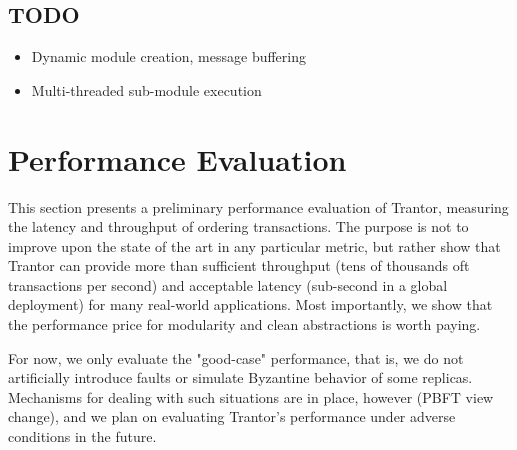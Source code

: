 \documentclass{article}
\begin{document}
\subsubsection{}
\subsubsection{}
\subsubsection{}
\subsubsection{}
\subsubsection{}

\subsection{TODO}

\begin{itemize}
    \item Dynamic module creation, message buffering
    \item Multi-threaded sub-module execution
\end{itemize}

\section{Performance Evaluation}
\label{sec:evaluation}

This section presents a preliminary performance evaluation of Trantor, measuring the latency and throughput of ordering transactions.
The purpose is not to improve upon the state of the art in any particular metric,
but rather show that Trantor can provide more than sufficient throughput (tens of thousands oft transactions per second)
and acceptable latency (sub-second in a global deployment) for many real-world applications.
Most importantly, we show that the performance price for modularity and clean abstractions is worth paying.

For now, we only evaluate the "good-case" performance, that is, we do not artificially introduce faults or simulate Byzantine behavior of some replicas.
Mechanisms for dealing with such situations are in place, however (PBFT view change),
and we plan on evaluating Trantor's performance under adverse conditions in the future.
\end{document}
